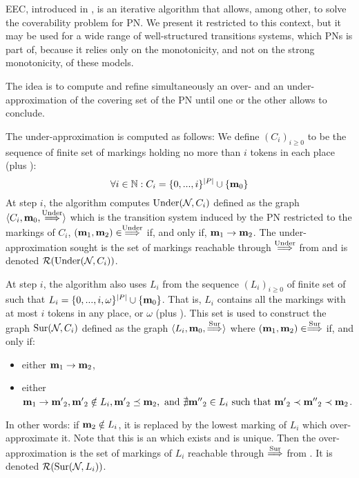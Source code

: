 \ac{EEC}, introduced in \cite{Geeraerts07thesis, Geeraerts06}, is an iterative algorithm that allows, among other, to solve the coverability problem for \ac{PN}.
We present it restricted to this context, but it may be used for a wide range of well-structured transitions systems, which \acp{PN} is part of, because it relies only on the monotonicity, and not on the strong monotonicity, of these models.

The idea is to compute and refine simultaneously an over- and an under-approximation of the covering set of the \ac{PN} until one or the other allows to conclude.

The under-approximation is computed as follows:
We define $(C_i)_{i \geq 0}$ to be the sequence of finite set of markings holding no more than $i$ tokens in each place (plus \mari):
\[
  \forall i \in \mathbb{N} : C_i = \{0, ..., i\}^{\left|P\right|} \cup \{\mathbf{m}_0\}
\]
At step $i$, the algorithm computes $\operatorname{Under}(\mathcal{N}_{}, C_i)$ defined as the graph $\langle C_i, \mathbf{m}_0, \stackrel{\operatorname{Under}}{\Longrightarrow} \rangle$ which is the transition system induced by the \ac{PN} \namePN restricted to the markings of $C_i$,  $(\mathbf{m}_1, \mathbf{m}_2) \in \stackrel{\operatorname{Under}}{\Longrightarrow}$ if, and only if, $\mathbf{m}_1 \rightarrow \mathbf{m}_2$.
The under-approximation sought is the set of markings reachable through $\stackrel{\operatorname{Under}}{\Longrightarrow}$ from \mari and is denoted $\operatorname{\mathcal{R}}(\operatorname{Under}(\mathcal{N}_{}, C_i))$.

At step $i$, the algorithm also uses $L_i$ from the sequence $(L_i)_{i \geq 0}$ of finite set of \omarks such that $L_i = \{0, ..., i, \omega \}^{\left|P\right|} \cup \{\mathbf{m}_0\}$.
That is, $L_i$ contains all the markings with at most $i$ tokens in any place, or $\omega$ (plus \mari).
This set is used to construct the graph $\operatorname{Sur}(\mathcal{N}_{}, C_i)$ defined as the graph $\langle L_i, \mathbf{m}_0, \stackrel{\operatorname{Sur}}{\Longrightarrow} \rangle$ where $(\mathbf{m}_1, \mathbf{m}_2) \in \stackrel{\operatorname{Sur}}{\Longrightarrow}$ if, and only if:
\begin{itemize}
  \item either $\mathbf{m}_1 \rightarrow \mathbf{m}_2$,
  \item either $\mathbf{m}_1 \rightarrow \mathbf{m'}_2, \mathbf{m'}_2 \notin L_i, \mathbf{m'}_2 \preceq \mathbf{m}_2, \text{ and } \nexists \mathbf{m''}_2 \in L_i \text{ such that } \mathbf{m'}_2 \prec \mathbf{m''}_2 \prec \mathbf{m}_2$.
\end{itemize}
In other words: if $\mathbf{m}_2 \notin L_i$, it is replaced by the lowest marking of $L_i$ which over-approximate it.
Note that this is an \omark which exists and is unique. 
Then the over-approximation is the set of markings of $L_i$ reachable through $\stackrel{\operatorname{Sur}}{\Longrightarrow}$ from \mari. It is denoted $\operatorname{\mathcal{R}}(\operatorname{Sur}(\mathcal{N}_{}, L_i))$.

